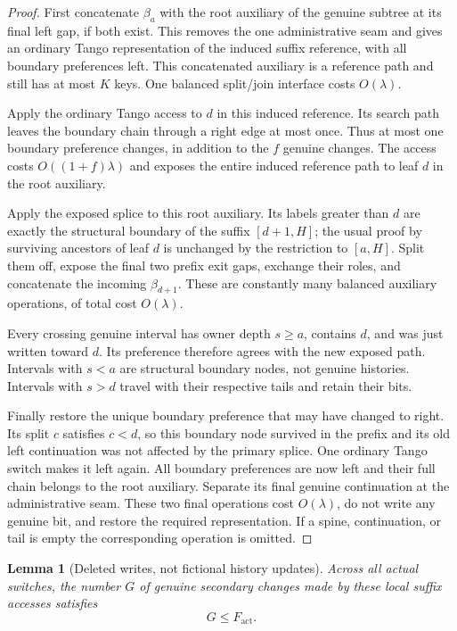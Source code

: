 \documentclass[11pt]{article}
\newtheorem{lemma}[theorem]{Lemma}
\begin{document}
\begin{proof}
First concatenate $\beta_a$ with the root auxiliary of the genuine
subtree at its final left gap, if both exist. This removes the one
administrative seam and gives an ordinary Tango representation of the
induced suffix reference, with all boundary preferences left. This
concatenated auxiliary is a reference path and still has at most $K$
keys. One balanced split/join interface costs $O(\lambda)$.

Apply the ordinary Tango access to $d$ in this induced reference. Its
search path leaves the boundary chain through a right edge at most
once. Thus at most one boundary preference changes, in addition to
the $f$ genuine changes. The access costs $O((1+f)\lambda)$ and exposes
the entire induced reference path to leaf $d$ in the root auxiliary.

Apply the exposed splice to this root auxiliary. Its labels greater
than $d$ are exactly the structural boundary of the suffix $[d+1,H]$;
the usual proof by surviving ancestors of leaf $d$ is unchanged by
the restriction to $[a,H]$. Split them off, expose the final two prefix
exit gaps, exchange their roles, and concatenate the incoming
$\beta_{d+1}$. These are constantly many balanced auxiliary operations,
of total cost $O(\lambda)$.

Every crossing genuine interval has owner depth $s\ge a$, contains
$d$, and was just written toward $d$. Its preference therefore agrees
with the new exposed path. Intervals with $s<a$ are structural boundary
nodes, not genuine histories. Intervals with $s>d$ travel with their
respective tails and retain their bits.

Finally restore the unique boundary preference that may have changed
to right. Its split $c$ satisfies $c<d$, so this boundary node survived
in the prefix and its old left continuation was not affected by the
primary splice. One ordinary Tango switch makes it left again. All
boundary preferences are now left and their full chain belongs to the
root auxiliary. Separate its final genuine continuation at the
administrative seam. These two final operations cost $O(\lambda)$,
do not write any genuine bit, and restore the required representation.
If a spine, continuation, or tail is empty the corresponding operation
is omitted.
\end{proof}

\begin{lemma}[Deleted writes, not fictional history updates]\label{lem:deletion}
Across all actual switches, the number $G$ of genuine secondary
changes made by these local suffix accesses satisfies
\[
 G\le F_{\mathrm{act}}.
\]
\end{lemma}
\end{document}
